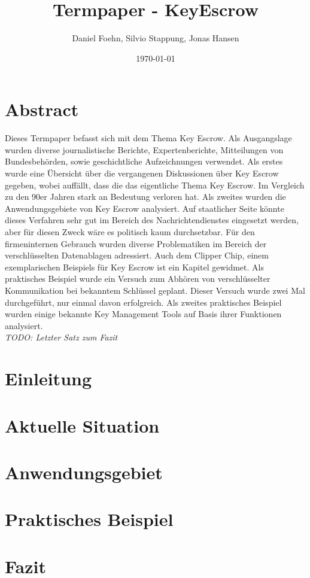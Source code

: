\documentclass[a4paper, 10pt, fleqn]{article}
\title{Termpaper - KeyEscrow}
\author{Daniel Foehn, Silvio Stappung, Jonas Hansen}
\date{\today} %
\newcommand*{\titleGM}{\begingroup %
\hbox{ %
\hspace*{0.2\textwidth} %
\rule{1pt}{\textheight} %
\hspace*{0.05\textwidth} %
\parbox[b]{0.75\textwidth}{ %

{\noindent\Huge\bfseries Termpaper \\[0.5\baselineskip] Key Escrow}\\[2\baselineskip] %
{\large \textit{HSLU Modul - Network \& Cloud Services}}\\[4\baselineskip] %
{\Large \textsc{Daniel Föhn, Jonas Hansen \\[0.5\baselineskip] und Silvio Stappung}} %

\vspace{0.5\textheight} %
{\noindent \today}\\[\baselineskip] %
}}
\endgroup}
\begin{document}
\begin{titlepage}
	\titleGM
	\thispagestyle{empty}
\end{titlepage}

\tableofcontents
\listoffigures
\clearpage

\section*{Abstract}
Dieses Termpaper befasst sich mit dem Thema Key Escrow. Als Ausgangslage wurden diverse journalistische Berichte, Expertenberichte, Mitteilungen von Bundesbehörden, sowie geschichtliche Aufzeichnungen verwendet. Als erstes wurde eine Übersicht über die vergangenen Diskussionen über Key Escrow gegeben, wobei auffällt, dass die das eigentliche Thema Key Escrow. Im Vergleich zu den 90er Jahren stark an Bedeutung verloren hat. Als zweites wurden die Anwendungsgebiete von Key Escrow analysiert. Auf staatlicher Seite könnte dieses Verfahren sehr gut im Bereich des Nachrichtendienstes eingesetzt werden, aber für diesen Zweck wäre es politisch kaum durchsetzbar. Für den firmeninternen Gebrauch wurden diverse Problematiken im Bereich der verschlüsselten Datenablagen adressiert. Auch dem Clipper Chip, einem exemplarischen Beispiels für Key Escrow ist ein Kapitel gewidmet. Als praktisches Beispiel wurde ein Versuch zum Abhören von verschlüsselter Kommunikation bei bekanntem Schlüssel geplant. Dieser Versuch wurde zwei Mal durchgeführt, nur einmal davon erfolgreich. Als zweites praktisches Beispiel wurden einige bekannte Key Management Tools auf Basis ihrer Funktionen analysiert.
\\ \large{\textit{TODO: Letzter Satz zum Fazit}}
\clearpage
\section{Einleitung}
	

\clearpage
\section{Aktuelle Situation}
	

\clearpage
\section{Anwendungsgebiet}
	

\clearpage
\section{Praktisches Beispiel}
	 

\clearpage
\section{Fazit}

\nocite{*}
\clearpage


\end{document}
